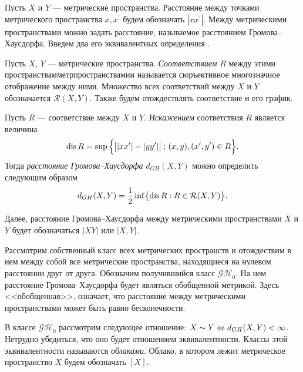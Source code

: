Пусть $X$ и $Y$ ---
метрические пространства. Расстояние между точками метрического пространства \( x, x^\prime \) будем обозначать \( | xx^\prime | \). Между метрическими пространствами можно задать расстояние, называемое
расстоянием Громова--Хаусдорфа. Введем два его эквивалентных
определения \cite{Lectures}.
\begin{defin}
  Пусть $X$, $Y$ --- метрические пространства. \emph{Соответствием}
  $R$ между этими пространствамметрпространствамии
  называется сюръективное многозначное отображение между ними.
  Множество всех соответствий между $X$ и $Y$ обозначается
  $\mathcal{R}(X,Y)$. Также будем отождествлять соответствие и его график.
\end{defin}
\begin{defin}
  Пусть $R$ --- соответствие между $X$ и $Y$.
  \emph{Искажением} соответствия $R$ является величина
  $$ \operatorname{dis}{R} = \sup{\Bigl\{ \big| |xx'| - |yy'| \big| : (x, y), (x',
  y') \in R\Bigr\}}.$$
  Тогда \emph{расстояние Громова--Хаусдорфа} $d_{GH}(X,Y)$ можно определить
  следующим образом
  $$ d_{GH}(X,Y) = \frac{1}{2}\inf \bigl\{\operatorname{dis}{R} : R \in
  \mathcal{R}(X,Y)\bigr\}.$$
  \label{defSootvet}
\end{defin}

Далее, расстояние Громова--Хаусдорфа между метрическими
пространствами $X$ и $Y$ будет обозначаться $|XY|$ или \( | X,Y | \).

Рассмотрим собственный класс всех метрических пространств и
отождествим в нем между собой все метрические пространства,
находящиеся на нулевом расстоянии друг от друга. Обозначим
получившийся класс $\mathcal{GH}_0$.  На нем расстояние
Громова--Хаусдорфа будет являться обобщенной метрикой. Здесь
<<обобщенная>>, означает, что расстояние между метрическими
пространствами может быть равно бесконечности.
\begin{defin} В классе $\mathcal{GH}_{0}$ рассмотрим следующее
  отношение: $X \thicksim Y \Leftrightarrow d_{GH}(X, Y) < \infty$. Нетрудно
  убедиться, что оно будет отношением эквивалентности. Классы этой
  эквивалентности
  называются \emph{облаками}. Облако, в котором лежит метрическое
  пространство $X$
  будем обозначать $[X]$.
\end{defin}

